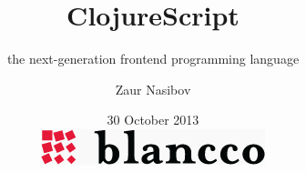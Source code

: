 \title{ClojureScript}
\subtitle{ the next-generation frontend programming language}

\author{Zaur Nasibov}


\date{30 October 2013
  \\
  \noindent
  \hspace{0.7\textwidth}
  {\includegraphics[scale=0.25]{blancco-logo}}
}
\subject{Frondend development}

\frame{\titlepage}
